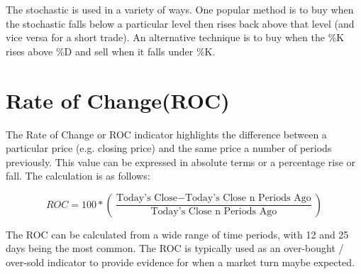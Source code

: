 The stochastic is used in a variety of ways. One popular method is to buy when the stochastic falls below a particular level then rises back above that level (and vice versa for a short trade). An alternative technique is to buy when the \%K rises above \%D and sell when it falls under \%K.

\section{Rate of Change(ROC)}
\label{appB:roc}
The Rate of Change or ROC indicator highlights the difference between a particular price (e.g. closing price) and the same price a number of periods previously. This value can be expressed in absolute terms or a percentage rise or fall. The calculation is as follows: 

\[ ROC = 100 * \left( \dfrac{ \text{Today's Close} - \text{Today's Close n Periods Ago}}{\text{Today's Close n Periods Ago}} \right) \]

The ROC can be calculated from a wide range of time periods, with 12 and 25 days being the most common. The ROC is typically used as an over-bought / over-sold indicator to provide evidence for when a market turn maybe expected.